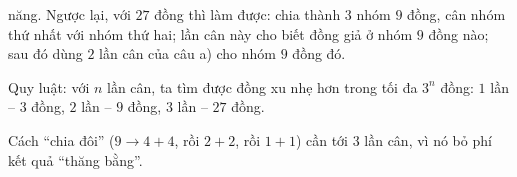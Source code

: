 {năng. Ngược lại, với $27$ đồng thì làm được: chia thành $3$ nhóm $9$ đồng, cân nhóm thứ nhất với nhóm thứ hai; lần cân này cho biết
đồng giả ở nhóm $9$ đồng nào; sau đó dùng $2$ lần cân của câu a) cho nhóm $9$ đồng đó.
\begin{tipbox}Quy luật: với $n$ lần cân, ta tìm được đồng xu nhẹ hơn trong tối đa $3^n$ đồng: $1$ lần -- $3$ đồng, $2$ lần -- $9$
đồng, $3$ lần -- $27$ đồng.\end{tipbox}
\begin{warnbox}Cách ``chia đôi'' ($9 \to 4 + 4$, rồi $2 + 2$, rồi $1 + 1$) cần tới $3$ lần cân, vì nó bỏ phí kết quả ``thăng
bằng''.\end{warnbox}
}

